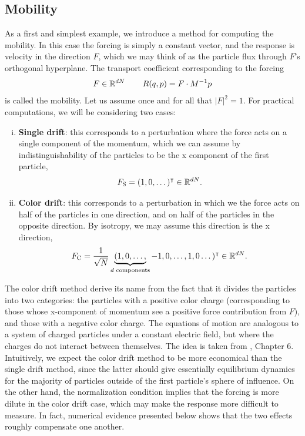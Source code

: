 \subsection{Mobility}
As a first and simplest example, we introduce a method for computing the mobility. In this case the forcing is simply a constant vector, and the response is velocity in the direction $F$, which we may think of as the particle flux through $F$'s orthogonal hyperplane.
The transport coefficient corresponding to the forcing
\begin{equation}
    \label{eq:nemd_mobility_definitions}
    F\in \mathbb{R}^{dN}\,\qquad R(q,p)=F\cdot M^{-1}p
\end{equation}
is called the mobility.
Let us assume once and for all that $|F|^2=1$.
For practical computations, we will be considering two cases:
\begin{enumerate}[(i)]
    \item \textbf{Single drift}: this corresponds to a perturbation where the force acts on a single component of the momentum, which we can assume by indistinguishability of the particles to be the x component of the first particle, \[F_{\mathrm{S}}=(1,0,\dots)^\intercal \in \mathbb{R}^{dN}.\]
    \item \textbf{Color drift}: this corresponds to a perturbation in which we the force acts on half of the particles in one direction, and on half of the particles in the opposite direction. By isotropy, we may assume this direction is the x direction, \[F_{\mathrm{C}}=\frac1{\sqrt N}\underbrace{(1,0,\dots,}_{d \text{ components}}-1,0,\dots,1,0\dots)^\intercal \in \mathbb{R}^{dN}.\]
\end{enumerate}
The color drift method derive its name from the fact that it divides the particles into two categories: the particles with a positive color charge (corresponding to those whose x-component of momentum see a positive force contribution from $F$), and those with a negative color charge.
The equations of motion are analogous to a system of charged particles under a constant electric field, but where the charges do not interact between themselves.
The idea is taken from \cite{EM08}, Chapter 6. Intuitively, we expect the color drift method to be more economical than the single drift method, since the latter should give essentially equilibrium dynamics for the majority of particles outside of the first particle's sphere of influence.
On the other hand, the normalization condition implies that the forcing is more dilute in the color drift case, which may make the response more difficult to measure. In fact, numerical evidence presented below shows that the two effects roughly compensate one another.

